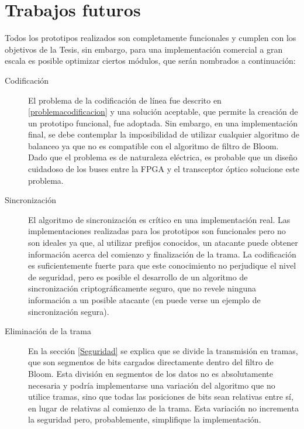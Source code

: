 \section{Trabajos futuros}

Todos los prototipos realizados son completamente funcionales y cumplen con los objetivos de la Tesis, sin embargo, para una implementación comercial a gran escala es posible optimizar ciertos módulos, que serán nombrados a continuación:
\begin{description}
 \item[Codificación] 
El problema de la codificación de línea fue descrito en \ref{problemacodificacion} y una solución aceptable, que permite la creación de un prototipo funcional, fue adoptada. Sin embargo, en una implementación final, se debe contemplar la imposibilidad de utilizar cualquier algoritmo de balanceo ya que no es compatible con el algoritmo de filtro de Bloom. Dado que el problema es de naturaleza eléctrica, es probable que un diseño cuidadoso de los buses entre la FPGA y el transceptor óptico solucione este problema.
 \item[Sincronización] 
 El algoritmo de sincronización es crítico en una implementación real. Las implementaciones realizadas para los prototipos son funcionales pero no son ideales ya que, al utilizar prefijos conocidos, un atacante puede obtener información acerca del comienzo y finalización de la trama. La codificación es suficientemente fuerte para que este conocimiento no perjudique el nivel de seguridad, pero es posible el desarrollo de un algoritmo de sincronización criptográficamente seguro, que no revele ninguna información a un posible atacante (en \cite{jung1999encryption} puede verse un ejemplo de sincronización segura).
 \item[Eliminación de la trama] 
 En la sección \ref{Seguridad} se explica que se divide la transmisión en tramas, que son segmentos de bits cargados directamente dentro del filtro de Bloom. Esta división en segmentos de los datos no es absolutamente necesaria y podría implementarse una variación del algoritmo que no utilice tramas, sino que todas las posiciones de bits sean relativas entre sí, en lugar de relativas al comienzo de la trama. Esta variación no incrementa la seguridad pero, probablemente, simplifique la implementación.
 \item[] 
\end{description}

